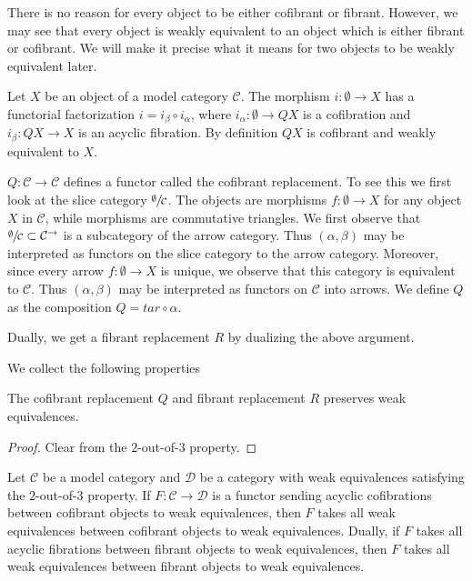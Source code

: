 \documentclass[../thesis.tex]{subfiles}
\begin{document}
            There is no reason for every object to be either cofibrant or fibrant. However, we may see that every object is weakly equivalent to an object which is either fibrant or cofibrant. We will make it precise what it means for two objects to be weakly equivalent later.

            \begin{construction}
                Let $X$ be an object of a model category $\mathcal{C}$. The morphism $i:\emptyset\rightarrow X$ has a functorial factorization $i=i_\beta\circ i_\alpha$, where $i_\alpha: \emptyset\rightarrow QX$ is a cofibration and $i_\beta: QX\rightarrow X$ is an acyclic fibration. By definition $QX$ is cofibrant and weakly equivalent to $X$.

                $Q: \mathcal{C}\rightarrow \mathcal{C}$ defines a functor called the cofibrant replacement. To see this we first look at the slice category $\sfrac{\emptyset}{\mathcal{C}}$. The objects are morphisms $f:\emptyset \rightarrow X$ for any object $X$ in $\mathcal{C}$, while morphisms are commutative triangles. We first observe that $\sfrac{\emptyset}{\mathcal{C}}\subset\mathcal{C}^\rightarrow$ is a subcategory of the arrow category. Thus $(\alpha, \beta)$ may be interpreted as functors on the slice category to the arrow category. Moreover, since every arrow $f:\emptyset \rightarrow X$ is unique, we observe that this category is equivalent to $\mathcal{C}$. Thus $(\alpha, \beta)$ may be interpreted as functors on $\mathcal{C}$ into arrows. We define $Q$ as the composition $Q = tar \circ \alpha$.

                Dually, we get a fibrant replacement $R$ by dualizing the above argument.
            \end{construction}

            We collect the following properties

            \begin{lemma}\label{lem: Q-preserves-weak}
                The cofibrant replacement $Q$ and fibrant replacement $R$ preserves weak equivalences. 
            \end{lemma}

            \begin{proof}
                Clear from the $2$-out-of-$3$ property.
            \end{proof}

            \begin{lemma}\label{lem: Ken-Brown}
                Let $\mathcal{C}$ be a model category and $\mathcal{D}$ be a category with weak equivalences satisfying the $2$-out-of-$3$ property. If $F:\mathcal{C} \rightarrow \mathcal{D}$ is a functor sending acyclic cofibrations between cofibrant objects to weak equivalences, then $F$ takes all weak equivalences between cofibrant objects to weak equivalences. Dually, if $F$ takes all acyclic fibrations between fibrant objects to weak equivalences, then $F$ takes all weak equivalences between fibrant objects to weak equivalences.
            \end{lemma}
\end{document}
